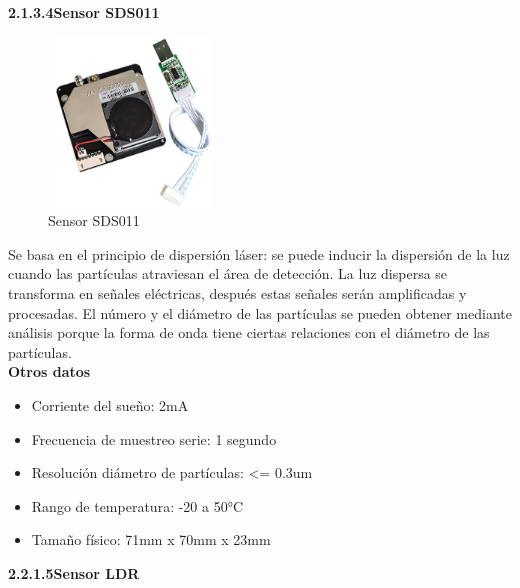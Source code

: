 \newpage

        \textbf{2.1.3.4\hspace{5mm}Sensor SDS011}

\vspace{1cm}

\begin{figure}[H]
      \centering
      \includegraphics[width=4.5cm, height=4.5cm]{imagenes/Sensor SDS011.jpg}
      \caption{Sensor SDS011}
      \label{imag:SDS011}
   \end{figure}

Se basa en el principio de dispersión láser: se puede inducir la dispersión de la luz cuando las partículas atraviesan el área de detección. La luz dispersa se transforma en señales eléctricas, después estas señales serán amplificadas y procesadas. El número y el diámetro de las partículas se pueden obtener mediante análisis porque la forma de onda tiene ciertas relaciones con el diámetro de las partículas.\\

\textbf{Otros datos}

\begin{itemize}
    \item Corriente del sueño: 2mA
    \item Frecuencia de muestreo serie: 1 segundo
    \item Resolución diámetro de partículas: <= 0.3um
    \item Rango de temperatura: -20 a 50°C
    \item Tamaño físico: 71mm x 70mm x 23mm 
\end{itemize}

\vspace{5cm}

        \textbf{2.2.1.5\hspace{5mm}Sensor LDR}\newline

